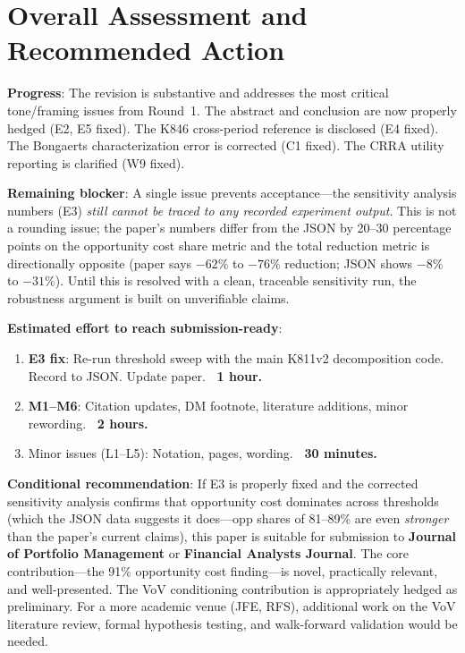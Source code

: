 \documentclass[12pt,a4paper]{article}
\begin{document}
\section*{Overall Assessment and Recommended Action}

\textbf{Progress}: The revision is substantive and addresses the most critical tone/framing issues from Round~1. The abstract and conclusion are now properly hedged (E2, E5 fixed). The K846 cross-period reference is disclosed (E4 fixed). The Bongaerts characterization error is corrected (C1 fixed). The CRRA utility reporting is clarified (W9 fixed).

\textbf{Remaining blocker}: A single issue prevents acceptance---the sensitivity analysis numbers (E3) \emph{still cannot be traced to any recorded experiment output}. This is not a rounding issue; the paper's numbers differ from the JSON by 20--30 percentage points on the opportunity cost share metric and the total reduction metric is directionally opposite (paper says $-62\%$ to $-76\%$ reduction; JSON shows $-8\%$ to $-31\%$). Until this is resolved with a clean, traceable sensitivity run, the robustness argument is built on unverifiable claims.

\textbf{Estimated effort to reach submission-ready}:
\begin{enumerate}
\item \textcolor{errorred}{\textbf{E3 fix}}: Re-run threshold sweep with the main K811v2 decomposition code. Record to JSON. Update paper. \textbf{~1 hour.}
\item \textcolor{warncolor}{\textbf{M1--M6}}: Citation updates, DM footnote, literature additions, minor rewording. \textbf{~2 hours.}
\item Minor issues (L1--L5): Notation, pages, wording. \textbf{~30 minutes.}
\end{enumerate}

\textbf{Conditional recommendation}: If E3 is properly fixed and the corrected sensitivity analysis confirms that opportunity cost dominates across thresholds (which the JSON data suggests it does---opp shares of 81--89\% are even \emph{stronger} than the paper's current claims), this paper is suitable for submission to \textbf{Journal of Portfolio Management} or \textbf{Financial Analysts Journal}. The core contribution---the 91\% opportunity cost finding---is novel, practically relevant, and well-presented. The VoV conditioning contribution is appropriately hedged as preliminary. For a more academic venue (JFE, RFS), additional work on the VoV literature review, formal hypothesis testing, and walk-forward validation would be needed.
\end{document}
